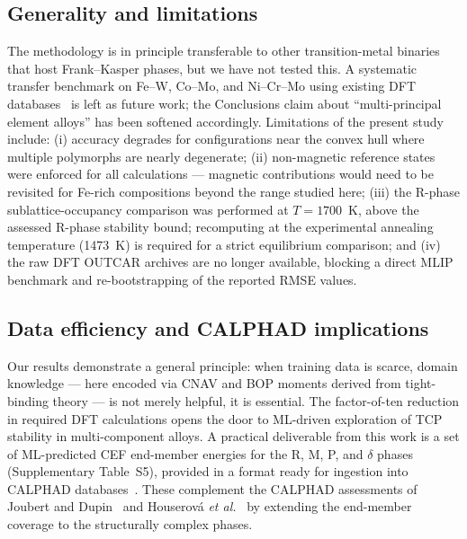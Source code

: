 \subsection{Generality and limitations}
\label{sec:limitations}

The methodology is in principle transferable to other transition-metal binaries that host Frank--Kasper phases, but we have not tested this. A systematic transfer benchmark on Fe--W, Co--Mo, and Ni--Cr--Mo using existing DFT databases~\cite{crivello_tcp,joubert_2008} is left as future work; the Conclusions claim about ``multi-principal element alloys'' has been softened accordingly. Limitations of the present study include: (i) accuracy degrades for configurations near the convex hull where multiple polymorphs are nearly degenerate; (ii) non-magnetic reference states were enforced for all calculations --- magnetic contributions would need to be revisited for Fe-rich compositions beyond the range studied here; (iii) the R-phase sublattice-occupancy comparison was performed at $T = 1700$~K, above the assessed R-phase stability bound; recomputing at the experimental annealing temperature (1473~K) is required for a strict equilibrium comparison; and (iv) the raw DFT OUTCAR archives are no longer available, blocking a direct MLIP benchmark and re-bootstrapping of the reported RMSE values.

\subsection{Data efficiency and CALPHAD implications}

Our results demonstrate a general principle: when training data is scarce, domain knowledge --- here encoded via CNAV and BOP moments derived from tight-binding theory --- is not merely helpful, it is essential. The factor-of-ten reduction in required DFT calculations opens the door to ML-driven exploration of TCP stability in multi-component alloys. A practical deliverable from this work is a set of ML-predicted CEF end-member energies for the R, M, P, and $\delta$ phases (Supplementary Table~S5), provided in a format ready for ingestion into CALPHAD databases~\cite{lukas_calphad}. These complement the CALPHAD assessments of Joubert and Dupin~\cite{joubert_dupin_2004} and Houserová \emph{et al.}~\cite{houserova_2002} by extending the end-member coverage to the structurally complex phases.
